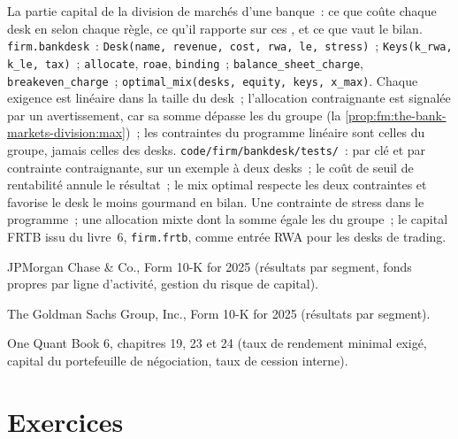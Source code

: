 \begin{build}
 La partie capital de la division de marchés d'une banque~: ce que coûte chaque desk en  selon chaque règle, ce qu'il rapporte sur ces , et ce que vaut le
bilan.
 \texttt{firm.bankdesk}~: \texttt{Desk(name, revenue, cost, rwa, le, stress)}~; \texttt{Keys(k\_rwa, k\_le, tax)}~;
\texttt{allocate}, \texttt{roae}, \texttt{binding}~; \texttt{balance\_sheet\_charge}, \texttt{breakeven\_charge}~;
\texttt{optimal\_mix(desks, equity, keys, x\_max)}.
 Chaque exigence est linéaire dans la taille du desk~; l'allocation contraignante est signalée par un avertissement, car sa somme dépasse les 
du groupe (la \cref{prop:fm:the-bank-markets-division:max})~; les contraintes du programme linéaire sont celles du groupe, jamais celles des desks.
 \texttt{code/firm/bankdesk/tests/}~:  par clé et par contrainte contraignante, sur un exemple à deux desks~; le coût de seuil de rentabilité annule le
résultat~; le mix optimal respecte les deux contraintes et favorise le desk le moins gourmand en bilan.
 Une contrainte de stress dans le programme~; une allocation mixte dont la somme égale les  du groupe~; le capital FRTB issu du
livre~6, \texttt{firm.frtb}, comme entrée RWA pour les desks de trading.
\end{build}

\begin{omsources}
\item JPMorgan Chase \& Co., Form 10-K for 2025 (résultats par segment, fonds propres par ligne d'activité, gestion du risque de capital).
\item The Goldman Sachs Group, Inc., Form 10-K for 2025 (résultats par segment).
\item One Quant Book 6, chapitres 19, 23 et 24 (taux de rendement minimal exigé, capital du portefeuille de négociation, taux de cession interne).
\end{omsources}

\section{Exercices}

